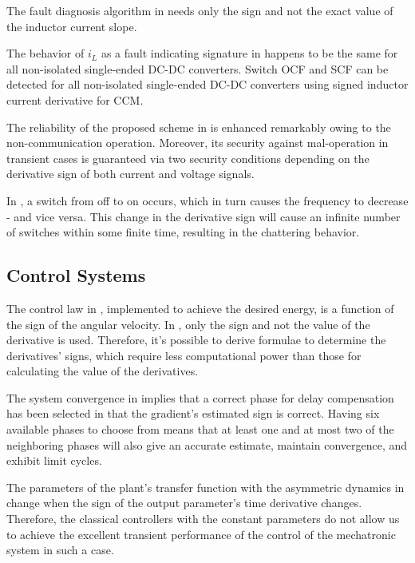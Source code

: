 \documentclass[11pt]{book}
\begin{document}
The fault diagnosis algorithm in \cite{jamshidpour2015photovoltaic}
needs only the sign and not the exact value of the inductor current
slope.

The behavior of $i_{L}$ as a fault indicating signature in \cite{bento2018comprehensive}
happens to be the same for all non-isolated single-ended DC-DC converters.
Switch OCF and SCF can be detected for all non-isolated single-ended
DC-DC converters using signed inductor current derivative for CCM.

The reliability of the proposed scheme in \cite{elgeziry2019non}
is enhanced remarkably owing to the non-communication operation. Moreover,
its security against mal-operation in transient cases is guaranteed
via two security conditions depending on the derivative sign of both
current and voltage signals.

In \cite{kasis2021primary}, a switch from off to on occurs, which
in turn causes the frequency to decrease - and vice versa. This change
in the derivative sign will cause an infinite number of switches within
some finite time, resulting in the chattering behavior.


\subsection{Control Systems}

The control law in \cite{huang2000control}, implemented to achieve
the desired energy, is a function of the sign of the angular velocity.
In \cite{valishevsky2002adaptive}, only the sign and not the value
of the derivative is used. Therefore, it's possible to derive formulae
to determine the derivatives' signs, which require less computational
power than those for calculating the value of the derivatives.

The system convergence in \cite{loizos2008adaptive} implies that
a correct phase for delay compensation has been selected in that the
gradient's estimated sign is correct. Having six available phases
to choose from means that at least one and at most two of the neighboring
phases will also give an accurate estimate, maintain convergence,
and exhibit limit cycles.

The parameters of the plant's transfer function with the asymmetric
dynamics in \cite{zlosnikas2008integral} change when the sign of
the output parameter's time derivative changes. Therefore, the classical
controllers with the constant parameters do not allow us to achieve
the excellent transient performance of the control of the mechatronic
system in such a case.
\end{document}

